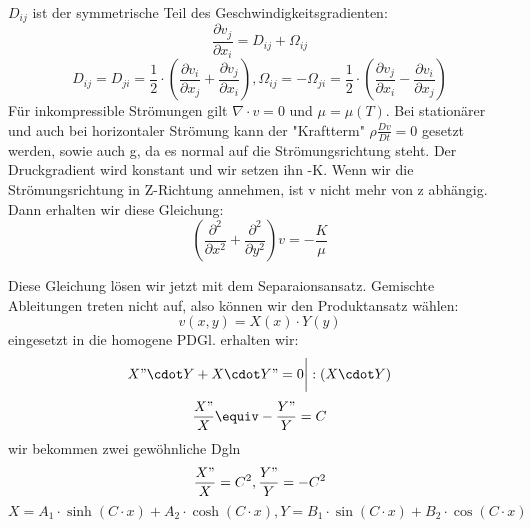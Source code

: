\documentclass[
	11pt, %
]{beamer}
\begin{document}
			\begin{frame}
				\begin{exampleblock}{}
			$D_{ij}$ ist der symmetrische Teil des Geschwindigkeitsgradienten:
			\begin{equation}
				\frac{\partial v_j}{\partial x_i}=D_{ij}+\Omega_{ij}
			\end{equation}
			\begin{equation}
				D_{ij}=D_{ji}=\frac{1}{2}\cdot \left(\frac{\partial v_i}{\partial x_j}+\frac{\partial v_j}{\partial x_i}\right), \Omega_{ij}=-\Omega_{ji}=\frac{1}{2}\cdot \left(\frac{\partial v_j}{\partial x_i}-\frac{\partial v_i}{\partial x_j}\right)
			\end{equation}
					F\"ur inkompressible Str\"omungen gilt $\nabla \cdot v=0$ und $\mu=\mu(T)$. Bei station\"arer und auch bei horizontaler Str\"omung  kann der "Kraftterm" $\rho \frac{Dv}{Dt}=0$ gesetzt werden, sowie auch g, da es normal auf die Str\"omungsrichtung steht. Der Druckgradient wird konstant und wir setzen ihn -K. Wenn wir die Str\"omungsrichtung in Z-Richtung annehmen, ist v nicht mehr von z abh\"angig. Dann erhalten wir diese Gleichung:
			\begin{equation}
				\left(\frac{\partial^2}{\partial x^2}+\frac{\partial^2}{\partial y^2}\right)v = -\frac{K}{\mu}
			\end{equation}
	\end{exampleblock}
\end{frame}
\begin{frame}
	\begin{exampleblock}{}
		Diese Gleichung l\"osen wir jetzt mit dem Separaionsansatz. Gemischte Ableitungen treten nicht auf, also k\"onnen wir den Produktansatz w\"ahlen:
		\begin{equation}
			v(x, y)=X(x)\cdot Y(y)
		\end{equation}
		eingesetzt in die homogene PDGl. erhalten wir:
		\begin{equation}
			X"\cdot Y+X\cdot Y"= 0\bigg|:\left(X\cdot Y\right)
		\end{equation}
		\begin{equation}
			\frac{X"}{X}\equiv -\frac{Y"}{Y}=C
		\end{equation}
		wir bekommen zwei gew\"ohnliche Dgln
		\begin{equation}
			\frac{X"}{X}=C^2, \frac{Y"}{Y}=-C^2
		\end{equation}
		\begin{equation}
			X=A_1\cdot \sinh\left(C\cdot x\right)+A_2\cdot \cosh\left(C\cdot x\right), Y=B_1\cdot \sin\left(C\cdot x\right)+B_2\cdot \cos\left(C\cdot x\right)
		\end{equation}
	\end{exampleblock}
\end{frame}
\end{document}

